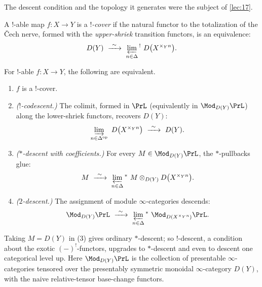 The descent condition and the topology it generates were the subject of
\cref{lec:17}.

\begin{definition}[$!$-cover]
\label{def:18:shriek-cover}
A $!$-able map $f\colon X\to Y$ is a \emph{$!$-cover} if the natural functor to the
totalization of the \v Cech nerve, formed with the \emph{upper-shriek} transition
functors, is an equivalence:
\begin{equation*}
D(Y)\ \xrightarrow{\ \sim\ }\ \varprojlim_{n\in\Delta}{}^{!}\ D\bigl(X^{\times_Y n}\bigr).
\end{equation*}
\end{definition}

\begin{theorem}
\label{thm:18:tfae}
For $!$-able $f\colon X\to Y$, the following are equivalent.
\begin{enumerate}
\item $f$ is a $!$-cover.
\item \emph{($!$-codescent.)} The colimit, formed in $\PrL$ (equivalently in
$\Mod_{D(Y)}\PrL$) along the lower-shriek functors, recovers $D(Y)$:
\begin{equation}
\label{eq:18:codescent}
\varinjlim_{n\in\Delta^{\mathrm{op}}}\ D\bigl(X^{\times_Y n}\bigr)\ \xrightarrow{\ \sim\ }\ D(Y).
\end{equation}
\item \emph{($*$-descent with coefficients.)} For every $M\in\Mod_{D(Y)}\PrL$, the
$*$-pullbacks glue:
\begin{equation*}
M\ \xrightarrow{\ \sim\ }\ \varprojlim_{n\in\Delta}{}^{*}\ M\otimes_{D(Y)}D\bigl(X^{\times_Y n}\bigr).
\end{equation*}
\item \emph{($2$-descent.)} The assignment of module $\infty$-categories descends:
\begin{equation*}
\Mod_{D(Y)}\PrL\ \xrightarrow{\ \sim\ }\ \varprojlim_{n\in\Delta}{}^{*}\ \Mod_{D(X^{\times_Y n})}\PrL.
\end{equation*}
\end{enumerate}
Taking $M=D(Y)$ in (3) gives ordinary $*$-descent; so $!$-descent, a condition
about the exotic $(-)^!$-functors, upgrades to $*$-descent and even to descent one
categorical level up. Here $\Mod_{D(Y)}\PrL$ is the collection of presentable
$\infty$-categories tensored over the presentably symmetric monoidal
$\infty$-category $D(Y)$, with the naive relative-tensor base-change functors.
\end{theorem}

